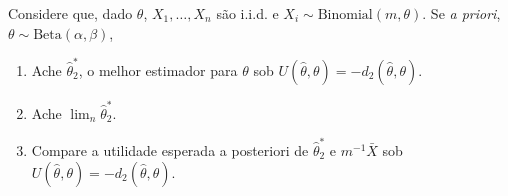 \begin{exercise}
 Considere que, dado $\theta$, 
 $X_{1},\ldots,X_{n}$ são i.i.d. e
 $X_{i} \sim \text{Binomial}(m, \theta)$.
 Se \emph{a priori},
 $\theta \sim \text{Beta}(\alpha,\beta)$,
 \begin{enumerate}[label=(\alph*)]
  \item Ache $\hat{\theta}^{*}_{2}$, 
  o melhor estimador para $\theta$ sob
  $U(\hat{\theta},\theta)=-d_{2}(\hat{\theta},\theta)$.
  \item Ache $\lim_{n}\hat{\theta}^{*}_{2}$.
  \item Compare a utilidade esperada a posteriori de
  $\hat{\theta}^{*}_{2}$ e $m^{-1}\bar{X}$ sob
  $U(\hat{\theta},\theta)=-d_{2}(\hat{\theta},\theta)$.
 \end{enumerate}
\end{exercise}

